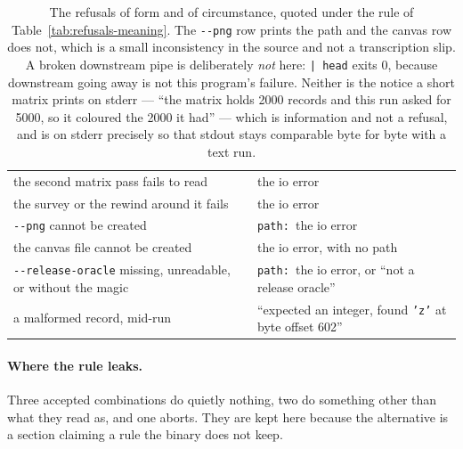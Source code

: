 \documentclass[11pt,a4paper]{article}
\newcommand{\flag}[1]{\texttt{-{}-#1}}
\begin{document}
\begin{table}[p]
\begin{tabular}{p{}p{}}
the second matrix pass fails to read & the io error \\
the survey or the rewind around it fails & the io error \\
\flag{png} cannot be created & \texttt{path: }the io error \\
the canvas file cannot be created & the io error, with no path \\
\flag{release-oracle} missing, unreadable, or without the magic & \texttt{path: }the io error, or ``not a release oracle'' \\
a malformed record, mid-run & ``expected an integer, found \texttt{'z'} at byte offset 602'' \\
\bottomrule
\end{tabular}
\caption{The refusals of form and of circumstance, quoted under the rule of
Table~\ref{tab:refusals-meaning}. The \flag{png} row prints the path and the
canvas row does not, which is a small inconsistency in the source and not a
transcription slip. A broken downstream pipe is deliberately \emph{not} here:
\texttt{| head} exits 0, because downstream going away is not this program's
failure. Neither is the notice a short matrix prints on stderr --- ``the matrix
holds 2000 records and this run asked for 5000, so it coloured the 2000 it
had'' --- which is information and not a refusal, and is on stderr precisely so
that stdout stays comparable byte for byte with a text run.}
\label{tab:refusals-form}
\end{table}

\paragraph{Where the rule leaks.} Three accepted combinations do quietly
nothing, two do something other than what they read as, and one aborts. They
are kept here because the alternative is a section claiming a rule the binary
does not keep.
\end{document}
